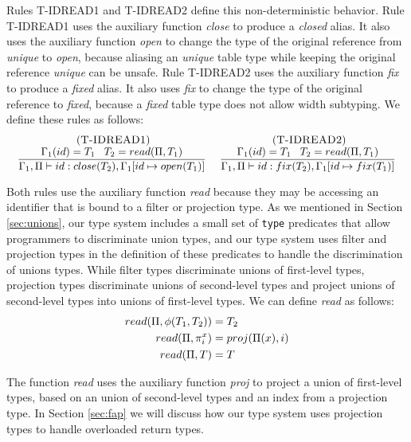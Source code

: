 Rules \textsc{T-IDREAD1} and \textsc{T-IDREAD2} define this non-deterministic behavior.
Rule \textsc{T-IDREAD1} uses the auxiliary function \emph{close} to
produce a \emph{closed} alias.
It also uses the auxiliary function \emph{open} to change the type of
the original reference from \emph{unique} to \emph{open},
because aliasing an \emph{unique} table type while keeping the original
reference \emph{unique} can be unsafe.
Rule \textsc{T-IDREAD2} uses the auxiliary function \emph{fix} to
produce a \emph{fixed} alias.
It also uses \emph{fix} to change the type of the original reference
to \emph{fixed}, because a \emph{fixed} table type does not allow
width subtyping.
We define these rules as follows:
\[
\begin{array}{c}
\begin{array}{c}
\; (\textsc{T-IDREAD1})\\
\dfrac{\Gamma_{1}(id) = T_{1} \;\;\; T_{2} = read(\Pi, T_{1})}
      {\Gamma_{1}, \Pi \vdash id:close(T_{2}), \Gamma_{1}[id \mapsto open(T_{1})]}
\end{array}
\;
\begin{array}{c}
\; (\textsc{T-IDREAD2})\\
\dfrac{\Gamma_{1}(id) = T_{1} \;\;\; T_{2} = read(\Pi, T_{1})}
      {\Gamma_{1}, \Pi \vdash id:fix(T_{2}), \Gamma_{1}[id \mapsto fix(T_{1})]}
\end{array}
\end{array}
\]

Both rules use the auxiliary function \emph{read} because they may be
accessing an identifier that is bound to a filter or projection type.
As we mentioned in Section \ref{sec:unions}, our type system includes
a small set of \texttt{type} predicates that allow programmers to
discriminate union types, and our type system uses filter and projection
types in the definition of these predicates to handle the discrimination
of unions types.
While filter types discriminate unions of first-level types, projection
types discriminate unions of second-level types and project unions of
second-level types into unions of first-level types.
We can define \emph{read} as follows:
\begin{align*}
read(\Pi, \phi(T_{1},T_{2})) & = T_{2}\\
read(\Pi, \pi_{i}^{x}) & = proj(\Pi(x), i)\\
read(\Pi, T) & = T
\end{align*}

The function \emph{read} uses the auxiliary function \emph{proj}
to project a union of first-level types, based on an union of
second-level types and an index from a projection type.
In Section \ref{sec:fap} we will discuss how our type system uses
projection types to handle overloaded return types.

